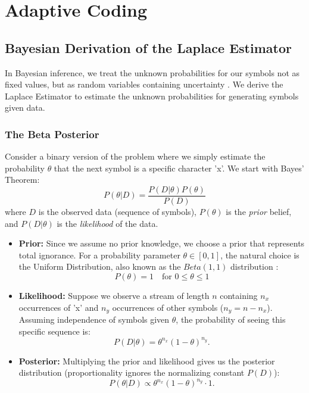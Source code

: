 \documentclass[11pt,a4paper]{article}
\theoremstyle{definition} %
\begin{document}
\section{Adaptive Coding}

\subsection{Bayesian Derivation of the Laplace Estimator}

In Bayesian inference, we treat the unknown probabilities for our symbols not as fixed values, but as random variables containing uncertainty \cite[p. 97]{godsill}. We derive the Laplace Estimator to estimate the unknown probabilities for generating symbols given data.

\subsubsection{The Beta Posterior}
Consider a binary version of the problem where we simply estimate the probability $\theta$ that the next symbol is a specific character 'x'. We start with Bayes' Theorem:
\begin{equation}
    P(\theta | D) = \frac{P(D | \theta) P(\theta)}{P(D)}
\end{equation}
where $D$ is the observed data (sequence of symbols), $P(\theta)$ is the \textit{prior} belief, and $P(D|\theta)$ is the \textit{likelihood} of the data.

\begin{itemize}[nosep]
    \item \textbf{Prior:}
          Since we assume no prior knowledge, we choose a prior that represents total ignorance. For a probability parameter $\theta \in [0,1]$, the natural choice is the Uniform Distribution, also known as the $Beta(1,1)$ distribution \cite[Ch 3]{mackay}:
          \begin{equation}
              P(\theta) = 1 \quad \text{for } 0 \le \theta \le 1
          \end{equation}
    \item \textbf{Likelihood:}
          Suppose we observe a stream of length $n$ containing $n_x$ occurrences of 'x' and $n_y$ occurrences of other symbols ($n_y = n - n_x$). Assuming independence of symbols given $\theta$, the probability of seeing this specific sequence is:
          \begin{equation}
              P(D | \theta) = \theta^{n_x} (1-\theta)^{n_y}.
          \end{equation}
    \item \textbf{Posterior:}
          Multiplying the prior and likelihood gives us the posterior distribution (proportionality ignores the normalizing constant $P(D)$):
          \begin{equation}
              P(\theta | D) \propto \theta^{n_x} (1-\theta)^{n_y} \cdot 1.
          \end{equation}
\end{itemize}
\end{document}
